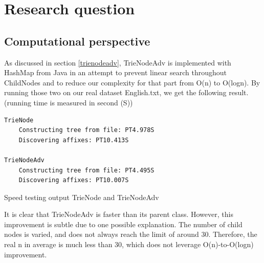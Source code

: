 \documentclass[12pt]{article}
\begin{document}
\section{Research question}
\subsection{Computational perspective}

As discussed in section \ref{trienodeadv}, TrieNodeAdv is implemented with HashMap from Java in an attempt to prevent linear search throughout ChildNodes and to reduce our complexity for that part from O(n) to O(logn). By running those two on our real dataset English.txt, we get the following result. (running time is measured in second (S))

\begin{listing}[H]
	\begin{verbatim}
TrieNode
	Constructing tree from file: PT4.978S
	Discovering affixes: PT10.413S

TrieNodeAdv
	Constructing tree from file: PT4.495S
	Discovering affixes: PT10.007S
	\end{verbatim}
	\caption{Speed testing output TrieNode and TrieNodeAdv}
\end{listing}

It is clear that TrieNodeAdv is faster than its parent class. However, this improvement is subtle due to one possible explanation. The number of child nodes is varied, and does not always reach the limit of around 30. Therefore, the real n in average is much less than 30, which does not leverage O(n)-to-O(logn) improvement.
\end{document}
